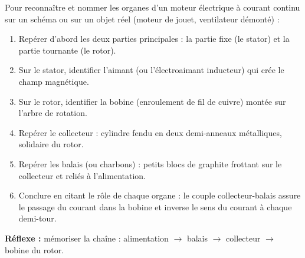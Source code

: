 \documentclass[11pt]{article}
\newcommand{\cle}[1]{{\popxbold\color{popdark}#1}}
\begin{document}
\begin{methode}
Pour reconnaître et nommer les organes d'un moteur électrique à courant continu sur un schéma ou sur un objet réel (moteur de jouet, ventilateur démonté) :
\begin{enumerate}
\item Repérer d'abord les deux parties principales : la partie \cle{fixe} (le \cle{stator}) et la partie \cle{tournante} (le \cle{rotor}).
\item Sur le stator, identifier l'\cle{aimant} (ou l'électroaimant inducteur) qui crée le champ magnétique.
\item Sur le rotor, identifier la \cle{bobine} (enroulement de fil de cuivre) montée sur l'\cle{arbre} de rotation.
\item Repérer le \cle{collecteur} : cylindre fendu en deux demi-anneaux métalliques, solidaire du rotor.
\item Repérer les \cle{balais} (ou charbons) : petits blocs de graphite frottant sur le collecteur et reliés à l'alimentation.
\item Conclure en citant le rôle de chaque organe : le couple collecteur-balais assure le passage du courant dans la bobine et inverse le sens du courant à chaque demi-tour.
\end{enumerate}
\textbf{Réflexe :} mémoriser la chaîne : alimentation $\rightarrow$ balais $\rightarrow$ collecteur $\rightarrow$ bobine du rotor.
\end{methode}
\end{document}

